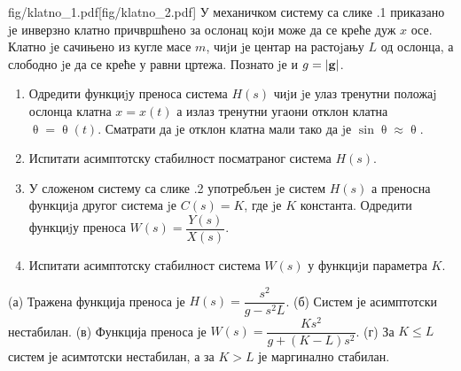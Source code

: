 \mnDifficult\begin{slikaDesno}{fig/klatno_1.pdf}[fig/klatno_2.pdf]
    \PID 
    У механичком систему са слике \ID.1 приказано jе инверзно клатно причвршћено
    за ослонац коjи може да се креће дуж $x$ осе. Клатно jе сачињено из кугле масе
    $m$, чиjи jе центар на растоjању $L$ од ослонца, а слободно jе да се креће у равни
    цртежа. Познато jе и $g = |{\bf g}|$.
    \begin{enumerate}[label=(\alph*)]
        \item Одредити функциjу преноса система $H(s)$ чиjи jе улаз тренутни положаj
              ослонца клатна $x = x(t)$ а излаз тренутни угаони отклон клатна 
              $\uptheta = \uptheta(t)$. Сматрати да jе отклон клатна мали тако да jе $\sin \uptheta \approx \uptheta$.
        \item Испитати асимптотску стабилност посматраног система $H(s)$.
        \item У сложеном систему са слике \ID.2 употребљен jе систем $H(s)$ а преносна функциjа другог система jе 
        $C(s) = K$, где jе $K$ константа. Одредити функциjу
        преноса $W(s) = \dfrac{Y(s)}{X(s)}$.
        \item Испитати асимптотску стабилност система $W(s)$ у функциjи параметра $K$.
    \end{enumerate}
\end{slikaDesno}

\REZULTAT

(а) Тражена функција преноса је $H(s) = \dfrac{s^2}{ g - s^2 L}$. (б) Систем је асимптотски нестабилан. 
(в) Функција преноса је $W(s) = \dfrac{K s^2}{g + (K - L) s^2}$.
(г) За $K \leq L$ систем је асимтотски нестабилан, а за $K > L$ је маргинално стабилан. 